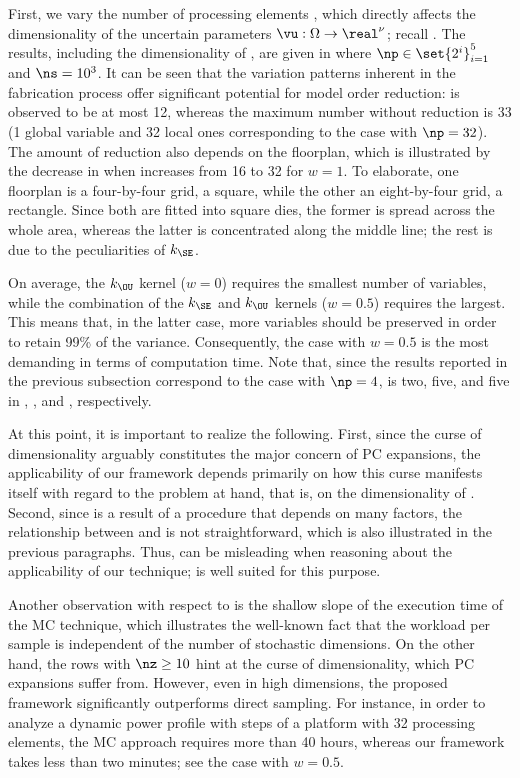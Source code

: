 First, we vary the number of processing elements \np, which directly affects the
dimensionality of the uncertain parameters $\vu: \Omega \to \real^\nu$; recall
. The results, including the dimensionality
\nz of \vz, are given in  where $\np \in
\set{2^i}_{i = 1}^5$ and $\ns = 10^3$. It can be seen that the variation
patterns inherent in the fabrication process \cite{cheng2011} offer significant
potential for model order reduction: \nz is observed to be at most 12, whereas
the maximum number without reduction is 33 (1 global variable and 32 local ones
corresponding to the case with $\np = 32$). The amount of reduction also depends
on the floorplan, which is illustrated by the decrease in \nz when \np increases
from 16 to 32 for $w = 1$. To elaborate, one floorplan is a four-by-four grid, a
square, while the other an eight-by-four grid, a rectangle. Since both are
fitted into square dies, the former is spread across the whole area, whereas the
latter is concentrated along the middle line; the rest is due to the
peculiarities of $k_\SE$.

On average, the $k_\OU$ kernel ($w = 0$) requires the smallest number of
variables, while the combination of the $k_\SE$ and $k_\OU$ kernels ($w = 0.5$)
requires the largest. This means that, in the latter case, more variables should
be preserved in order to retain 99\% of the variance. Consequently, the case
with $w = 0.5$ is the most demanding in terms of computation time. Note that,
since the results reported in the previous subsection correspond to the case
with $\np = 4$, \nz is two, five, and five in ,
, and ,
respectively.

At this point, it is important to realize the following. First, since the curse
of dimensionality arguably constitutes the major concern of \ac{PC} expansions,
the applicability of our framework depends primarily on how this curse manifests
itself with regard to the problem at hand, that is, on the dimensionality \nz of
\vz. Second, since \vz is a result of a procedure that depends on many factors,
the relationship between \vu and \vz is not straightforward, which is also
illustrated in the previous paragraphs. Thus, \nu can be misleading when
reasoning about the applicability of our technique; \nz is well suited for this
purpose.

Another observation with respect to  is the
shallow slope of the execution time of the \ac{MC} technique, which illustrates
the well-known fact that the workload per sample is independent of the number of
stochastic dimensions. On the other hand, the rows with $\nz \geq 10$ hint at
the curse of dimensionality, which \ac{PC} expansions suffer from. However, even
in high dimensions, the proposed framework significantly outperforms direct
sampling. For instance, in order to analyze a dynamic power profile with
 steps of a platform with 32 processing elements, the \ac{MC}
approach requires more than 40 hours, whereas our framework takes less than two
minutes; see the case with $w = 0.5$.

